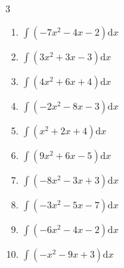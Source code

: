 \begin{multicols}{3}
\begin{enumerate}

\columnbreak %

  \item $\displaystyle \int \left( -7x^{2}-4x-2 \right) \mathrm{d}x$


  \item $\displaystyle \int \left( 3x^{2}+3x-3 \right) \mathrm{d}x$


  \item $\displaystyle \int \left( 4x^{2}+6x+4 \right) \mathrm{d}x$


  \item $\displaystyle \int \left( -2x^{2}-8x-3 \right) \mathrm{d}x$


  \item $\displaystyle \int \left( x^{2}+2x+4 \right) \mathrm{d}x$


  \item $\displaystyle \int \left( 9x^{2}+6x-5 \right) \mathrm{d}x$


  \item $\displaystyle \int \left( -8x^{2}-3x+3 \right) \mathrm{d}x$


  \item $\displaystyle \int \left( -3x^{2}-5x-7 \right) \mathrm{d}x$


  \item $\displaystyle \int \left( -6x^{2}-4x-2 \right) \mathrm{d}x$


  \item $\displaystyle \int \left( -x^{2}-9x+3 \right) \mathrm{d}x$


\end{enumerate}
\end{multicols}
